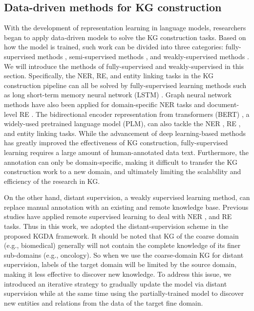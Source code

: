\documentclass[sigconf]{acmart}
\begin{document}
\subsection{Data-driven methods for KG construction}
With the development of representation learning in language models, researchers began to apply data-driven models to solve the KG construction tasks. Based on how the model is trained, such work can be divided into three categories: fully-supervised methods \cite{zhao2019construction, li2022medukg}, semi-supervised methods \cite{zahera2021asset}, and weakly-supervised methods \cite{yu2021domain}. We will introduce the methods of fully-supervised and weakly-supervised in this section. Specifically, the NER, RE, and entity linking tasks in the KG construction pipeline can all be solved by fully-supervised learning methods such as long short-term memory neural network (LSTM) \cite{hochreiter1997long,zeng2017lstm}. Graph neural network methods have also been applied for domain-specific NER tasks \cite{chen2021explicitly} and document-level RE \cite{zhang2020document}. The bidirectional encoder representation from transformers (BERT) \cite{kenton2019bert}, a widely-used pretrained language model (PLM), can also tackle the NER \cite{jia2020entity}, RE \cite{roy2021incorporating}, and entity linking \cite{li2022lp} tasks. While the advancement of deep learning-based methods has greatly improved the effectiveness of KG construction, fully-supervised learning requires a large amount of human-annotated data text. Furthermore, the annotation can only be domain-specific, making it difficult to transfer the KG construction work to a new domain, and ultimately limiting the scalability and efficiency of the research in KG.

On the other hand, distant supervision, a weakly supervised learning method, can replace manual annotation with an existing and remote knowledge base. Previous studies have applied remote supervised learning to deal with NER \cite{zheng2021distantly}, and RE \cite{wei2021distantly,zhang2021readsre} tasks. Thus in this work, we adopted the distant-supervision scheme in the proposed KGDA framework. It should be noted that KG of the coarse domain (e.g., biomedical) generally will not contain the complete knowledge of its finer sub-domains (e.g., oncology). So when we use the coarse-domain KG for distant supervision, labels of the target domain will be limited by the source domain, making it less effective to discover new knowledge. To address this issue, we introduced an iterative strategy to gradually update the model via distant supervision while at the same time using the partially-trained model to discover new entities and relations from the data of the target fine domain. 
\end{document}
